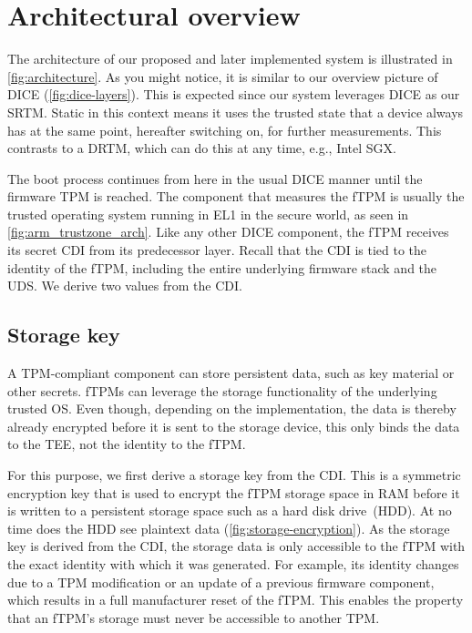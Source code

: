 

\section{Architectural overview}\label{sec:arch_overview}



The architecture of our proposed and later implemented system is illustrated in \autoref{fig:architecture}.
As you might notice, it is similar to our overview picture of \ac{DICE} (\autoref{fig:dice-layers}).
This is expected since our system leverages \ac{DICE} as our \ac{SRTM}.
Static in this context means it uses the trusted state that a device always has at the same point, hereafter switching on, for further measurements.
This contrasts to a \ac{DRTM}, which can do this at any time, e.g., Intel SGX\@.

The boot process continues from here in the usual \ac{DICE} manner until the firmware TPM is reached.
The component that measures the \ac{fTPM} is usually the trusted operating system running in EL1 in the secure world, as seen in \autoref{fig:arm_trustzone_arch}.
Like any other \ac{DICE} component, the \ac{fTPM} receives its secret \ac{CDI} from its predecessor layer.
Recall that the \ac{CDI} is tied to the identity of the \ac{fTPM}, including the entire underlying firmware stack and the \ac{UDS}\@.
We derive two values from the \ac{CDI}\@.

\subsection{Storage key}\label{subsec:storage-key}


A TPM-compliant component can store persistent data, such as key material or other secrets.
\Acp{fTPM} can leverage the storage functionality of the underlying trusted OS\@.
Even though, depending on the implementation, the data is thereby already encrypted before it is sent to the storage device, this only binds the data to the \ac{TEE}, not the identity to the \ac{fTPM}.

For this purpose, we first derive a storage key from the \ac{CDI}.
This is a symmetric encryption key that is used to encrypt the \ac{fTPM} storage space in RAM before it is written to a persistent storage space such as a hard disk drive~(HDD).
At no time does the HDD see plaintext data (\autoref{fig:storage-encryption}).
As the storage key is derived from the \ac{CDI}, the storage data is only accessible to the \ac{fTPM} with the exact identity with which it was generated.
For example, its identity changes due to a \ac{TPM} modification or an update of a previous firmware component, which results in a full manufacturer reset of the fTPM\@.
This enables the property that an \ac{fTPM}'s storage must never be accessible to another \ac{TPM}\@.

